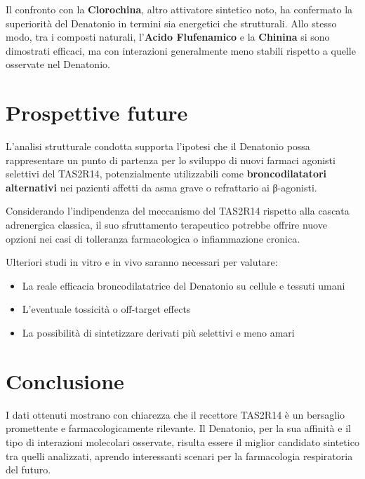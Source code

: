\documentclass[12pt, a4paper]{book}
\begin{document}
Il confronto con la \textbf{Clorochina}, altro attivatore sintetico noto, ha confermato la superiorità del Denatonio in termini sia energetici che strutturali. Allo stesso modo, tra i composti naturali, l’\textbf{Acido Flufenamico} e la \textbf{Chinina} si sono dimostrati efficaci, ma con interazioni generalmente meno stabili rispetto a quelle osservate nel Denatonio.

\section*{Prospettive future}
L’analisi strutturale condotta supporta l’ipotesi che il Denatonio possa rappresentare un punto di partenza per lo sviluppo di nuovi farmaci agonisti selettivi del TAS2R14, potenzialmente utilizzabili come \textbf{broncodilatatori alternativi} nei pazienti affetti da asma grave o refrattario ai β-agonisti.

Considerando l’indipendenza del meccanismo del TAS2R14 rispetto alla cascata adrenergica classica, il suo sfruttamento terapeutico potrebbe offrire nuove opzioni nei casi di tolleranza farmacologica o infiammazione cronica.

Ulteriori studi in vitro e in vivo saranno necessari per valutare:
\begin{itemize}
    \item La reale efficacia broncodilatatrice del Denatonio su cellule e tessuti umani
    \item L’eventuale tossicità o off-target effects
    \item La possibilità di sintetizzare derivati più selettivi e meno amari
\end{itemize}

\section*{Conclusione}
I dati ottenuti mostrano con chiarezza che il recettore TAS2R14 è un bersaglio promettente e farmacologicamente rilevante. Il Denatonio, per la sua affinità e il tipo di interazioni molecolari osservate, risulta essere il miglior candidato sintetico tra quelli analizzati, aprendo interessanti scenari per la farmacologia respiratoria del futuro.
\end{document}
